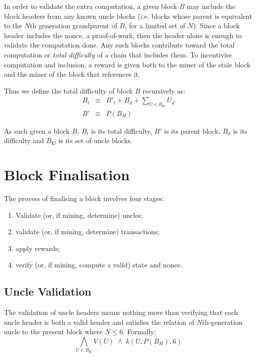 \documentclass[9pt,oneside]{amsart}
\begin{document}
\begin{multicols}{2}
In order to validate the extra computation, a given block $B$ may include the block headers from any known uncle blocks (i.e. blocks whose parent is equivalent to the $N$th generation grandparent of $B$, for a limited set of $N$). Since a block header includes the nonce, a proof-of-work, then the header alone is enough to validate the computation done. Any such blocks contribute toward the total computation or \textit{total difficulty} of a chain that includes them. To incentivise computation and inclusion, a reward is given both to the miner of the stale block and the miner of the block that references it.

Thus we define the total difficulty of block $B$ recursively as:
\begin{eqnarray}
B_t & \equiv & B'_t + B_d + \sum\limits_{U \in B_\mathbf{U}} U_d \\
B' & \equiv & P(B_H)
\end{eqnarray}

As such given a block $B$, $B_t$ is its total difficulty, $B'$ is its parent block, $B_d$ is its difficulty and $B_\mathbf{U}$ is its set of uncle blocks.

\section{Block Finalisation} \label{ch:finalisation}

The process of finalising a block involves four stages:

\begin{enumerate}
\item Validate (or, if mining, determine) uncles;
\item validate (or, if mining, determine) transactions;
\item apply rewards;
\item verify (or, if mining, compute a valid) state and nonce.
\end{enumerate}

\subsection{Uncle Validation}

The validation of uncle headers means nothing more than verifying that each uncle header is both a valid header and satisfies the relation of $N$th-generation uncle to the present block where $N \leq 6$. Formally:
\begin{equation}
\bigwedge_{U \in B_\mathbf{U}} V(U) \; \wedge \; k(U, P(B_H), 6)
\end{equation}


\end{multicols}
\end{document}
